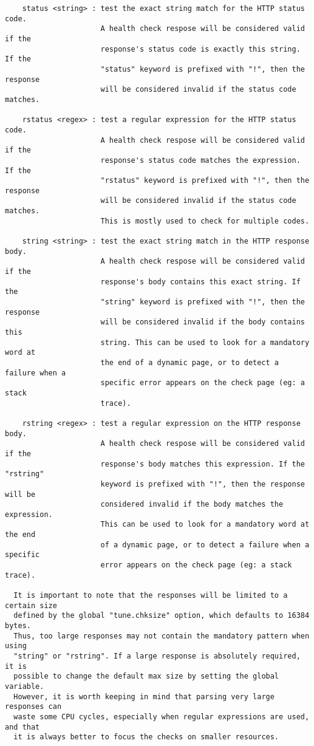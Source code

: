 \begin{verbatim}
    status <string> : test the exact string match for the HTTP status code.
                      A health check respose will be considered valid if the
                      response's status code is exactly this string. If the
                      "status" keyword is prefixed with "!", then the response
                      will be considered invalid if the status code matches.

    rstatus <regex> : test a regular expression for the HTTP status code.
                      A health check respose will be considered valid if the
                      response's status code matches the expression. If the
                      "rstatus" keyword is prefixed with "!", then the response
                      will be considered invalid if the status code matches.
                      This is mostly used to check for multiple codes.

    string <string> : test the exact string match in the HTTP response body.
                      A health check respose will be considered valid if the
                      response's body contains this exact string. If the
                      "string" keyword is prefixed with "!", then the response
                      will be considered invalid if the body contains this
                      string. This can be used to look for a mandatory word at
                      the end of a dynamic page, or to detect a failure when a
                      specific error appears on the check page (eg: a stack
                      trace).

    rstring <regex> : test a regular expression on the HTTP response body.
                      A health check respose will be considered valid if the
                      response's body matches this expression. If the "rstring"
                      keyword is prefixed with "!", then the response will be
                      considered invalid if the body matches the expression.
                      This can be used to look for a mandatory word at the end
                      of a dynamic page, or to detect a failure when a specific
                      error appears on the check page (eg: a stack trace).

  It is important to note that the responses will be limited to a certain size
  defined by the global "tune.chksize" option, which defaults to 16384 bytes.
  Thus, too large responses may not contain the mandatory pattern when using
  "string" or "rstring". If a large response is absolutely required, it is
  possible to change the default max size by setting the global variable.
  However, it is worth keeping in mind that parsing very large responses can
  waste some CPU cycles, especially when regular expressions are used, and that
  it is always better to focus the checks on smaller resources.


\end{verbatim}
